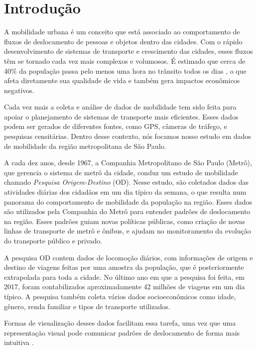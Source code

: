 \chapter{Introdução}
\label{cap:introducao}

A mobilidade urbana é um conceito que está associado ao comportamento de fluxos
de deslocamento de pessoas e objetos dentro das cidades. Com o rápido
desenvolvimento de sistemas de transporte e crescimento das cidades, esses
fluxos têm se tornado cada vez mais complexos e volumosos. É estimado que cerca
de 40\% da população passa pelo menos uma hora no trânsito todos os dias
\citep{Zhang2011}, o que afeta diretamente sua qualidade de vida e também gera
impactos econômicos negativos.

Cada vez mais a coleta e análise de dados de mobilidade tem sido feita para
apoiar o planejamento de sistemas de transporte mais eficientes. Esses dados
podem ser gerados de diferentes fontes, como GPS, câmeras de tráfego, e
pesquisas censitárias. Dentro desse contexto, nós focamos nosso estudo em
dados de mobilidade da região metropolitana de S\~ao Paulo.

A cada dez anos, desde 1967, a Companhia Metropolitano de São Paulo (Metrô), que gerencia o
sistema de metrô da cidade, conduz um estudo de mobilidade chamado
\emph{Pesquisa Origem-Destino} (OD).  Nesse estudo, são coletados dados das
atividades diárias dos cidadãos em um dia típico da semana, o que resulta num
panorama do comportamento de mobilidade da população na região. Esses dados são
utilizados pela Companhia do Metrô para entender padrões de deslocamento na
região. Esses padrões guiam novas políticas públicas, como criação de novas
linhas de transporte de metrô e ônibus, e ajudam no monitoramento da evolução
do transporte público e privado.

A pesquisa OD contem dados de locomoção diários, com informações de origem e
destino de viagens feitas por uma amostra da população, que é posteriormente
extrapolada para toda a cidade. No último ano em que a pesquisa foi feita, em
2017, foram contabilizados aproximadamente 42 milhões de viagens em um dia
típico. A pesquisa também coleta vários dados socioeconômicos como idade,
gênero, renda familiar e tipos de transporte utilizados. 

Formas de visualização desses dados facilitam essa tarefa, uma vez que uma
representação visual pode comunicar padrões de deslocamento de forma mais
intuitiva \citep{Liu2013}. 




